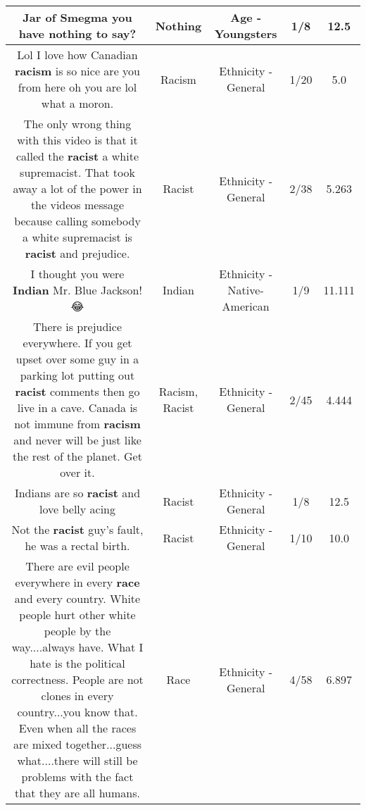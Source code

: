 \documentclass[11pt]{article}
\newlength\mylength
\begin{document}
\begin{center}
\begin{longtable}{|C{.65\mylength}|C{.30\mylength}|C{.12\mylength}|C{.12\mylength}|C{.12\mylength}|}
  \small Jar of Smegma you have \textbf{nothing} to say?\normalsize   & Nothing & Age - Youngsters & 1/8 & 12.5 \\  \hline
  \small Lol I love how Canadian \textbf{racism} is so nice are you from here oh you are lol what a moron.\normalsize   & Racism & Ethnicity - General & 1/20 & 5.0 \\  \hline
  \small The only wrong thing with this video is that it called the \textbf{racist} a white supremacist. That took away a lot of the power in the videos message because calling somebody a white supremacist is \textbf{racist} and prejudice.\normalsize   & Racist & Ethnicity - General & 2/38 & 5.263 \\  \hline
  \small I thought you were \textbf{Indian} Mr. Blue Jackson! 😂\normalsize   & Indian & Ethnicity - Native-American & 1/9 & 11.111 \\  \hline
  \small There is prejudice everywhere.  If you get upset over some guy in a parking lot putting out \textbf{racist} comments then go live in a cave.  Canada is not immune from \textbf{racism} and never will be just like the rest of the planet.  Get over it.\normalsize   & Racism, Racist & Ethnicity - General & 2/45 & 4.444 \\  \hline
  \small Indians are so \textbf{racist} and love belly acing\normalsize   & Racist & Ethnicity - General & 1/8 & 12.5 \\  \hline
  \small Not the \textbf{racist} guy's fault, he was a rectal birth.\normalsize   & Racist & Ethnicity - General & 1/10 & 10.0 \\  \hline
  \small There are evil people everywhere in every \textbf{race} and every country.  White people hurt other white people by the way....always have.  What I hate is the political correctness.  People are not clones in every country...you  know that.  Even when all the races are mixed together...guess what....there will still be problems with the fact that they are all humans.\normalsize   & Race & Ethnicity - General & 4/58 & 6.897 \\  \hline

\end{longtable}
\end{center}
\end{document}
